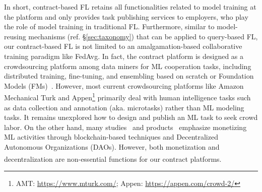 In short, contract-based FL retains all functionalities related to model training at the platform and only provides task publishing services to employers, who play the role of model training in traditional FL.
Furthermore, similar to model-reusing mechanisms (ref. \S\ref{sec:taxonomy}) that can be applied to query-based FL, our contract-based FL is not limited to an amalgamation-based collaborative training paradigm like FedAvg.
In fact, the contract platform is designed as a crowdsourcing platform among data miners for ML cooperation tasks, including distributed training, fine-tuning, and ensembling based on scratch or Foundation Models (FMs)~\cite{yuan2022decentralized}.
However, most current crowdsourcing platforms like Amazon Mechanical Turk and Appen\footnote{AMT: \url{https://www.mturk.com/}; Appen: \url{https://appen.com/crowd-2/}} primarily deal with human intelligence tasks such as data collection and annotation (aka. microtasks) rather than ML modeling tasks. 
It remains unexplored how to design and publish an ML task to seek crowd labor.
On the other hand, many studies~\cite{dias2022blocklearning, blythman2022decentralized, deng2021flex, guo2023blockchain, batool2022fl} and products~\cite{steeves2022incentivizing, ziller2021pysyft, mcconaghy2022ocean} emphasize monetizing ML activities through blockchain-based techniques and Decentralized Autonomous Organizations (DAOs). 
However, both monetization and decentralization are non-essential functions for our contract platforms\textsuperscript{}.



